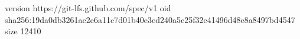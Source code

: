 version https://git-lfs.github.com/spec/v1
oid sha256:19da0db3261ac2e6a11c7d01b40e3ed240a5c25f32e41496d48e8a8497bd4547
size 12410
